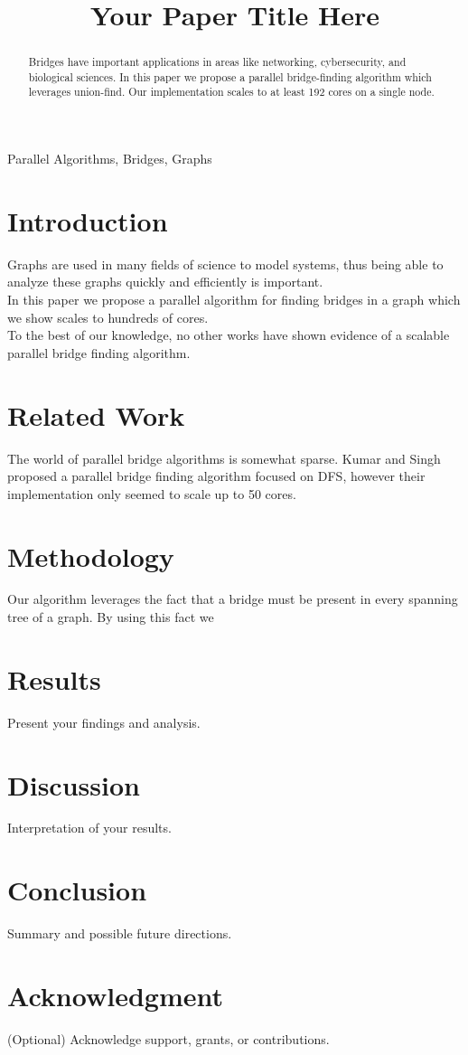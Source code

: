 \documentclass[conference]{IEEEtran}
\title{Your Paper Title Here}
\author{
\IEEEauthorblockN{Keegan Smith}
\IEEEauthorblockA{
\textit{Computer Science} \\
\textit{Texas A\&M University} \\
College Station TX, United States \\
keeganasmith2003@tamu.edu
}
}
\begin{document}
\maketitle

\begin{abstract}
Bridges have important applications in areas like networking, cybersecurity, and biological sciences. In this paper we propose a parallel bridge-finding algorithm which leverages union-find. Our implementation scales to at least 192 cores on a single node. 
\end{abstract}

\begin{IEEEkeywords}
Parallel Algorithms, Bridges, Graphs
\end{IEEEkeywords}

\section{Introduction}
Graphs are used in many fields of science to model systems, thus being able to analyze these graphs quickly and efficiently is important. \\
In this paper we propose a parallel algorithm for finding bridges in a graph which we show scales to hundreds of cores. \\
To the best of our knowledge, no other works have shown evidence of a scalable parallel bridge finding algorithm.
\section{Related Work}
The world of parallel bridge algorithms is somewhat sparse. Kumar and Singh ~\cite{kumar2021efficient} proposed a parallel bridge finding algorithm focused on DFS, however their implementation only seemed to scale up to 50 cores.
\section{Methodology}
Our algorithm leverages the fact that a bridge must be present in every spanning tree of a graph. By using this fact we 
\section{Results}
Present your findings and analysis.

\section{Discussion}
Interpretation of your results.

\section{Conclusion}
Summary and possible future directions.

\section*{Acknowledgment}
(Optional) Acknowledge support, grants, or contributions.



\end{document}
